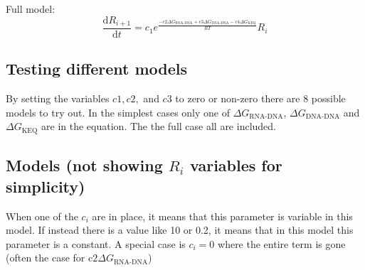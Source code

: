 \documentclass[a4paper]{article}
\newcommand{\diff}[2]{\frac{\mathrm{d} #1}{\mathrm{d} #2}}
\begin{document}
 


Full model:
\begin{equation*}
	\diff{R_{i+1}}{t} = c_1e^{\frac{-c2\Delta G_{\text{RNA-DNA}} + c3\Delta
	G_{\text{DNA-DNA}} - c4\Delta G_{\text{KEQ}}}{RT}}R_{i}
\end{equation*}

\subsection{Testing different models}

By setting the variables $c1, c2,$ and $c3$ to zero or non-zero there are 8
possible models to try out. In the simplest cases only one of $\Delta
G_{\text{RNA-DNA}}$, $\Delta G_{\text{DNA-DNA}}$ and $\Delta G_{\text{KEQ}}$
are in the equation.  The the full case all are included.

\subsection{Models (not showing $R_i$ variables for simplicity)}
When one of the $c_i$ are in place, it means that this parameter is variable in
this model. If instead there is a value like 10 or 0.2, it means that in this
model this parameter is a constant. A special case is $c_i = 0$ where the
entire term is gone (often the case for c$2\Delta G_{\text{RNA-DNA}}$)
\end{document}

